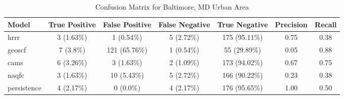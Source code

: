 \begin{table}[h!]
\centering
\begin{tabular}{lcccccc}
\hline
Model & True Positive & False Positive & False Negative & True Negative & Precision & Recall\\ \hline
hrrr & 3 (1.63\%) & 1 (0.54\%) & 5 (2.72\%) & 175 (95.11\%) & \cellcolor{red!25}0.75 & \cellcolor{red!25}0.38 \\ 
geoscf & 7 (3.8\%) & 121 (65.76\%) & 1 (0.54\%) & 55 (29.89\%) & \cellcolor{red!25}0.05 & \cellcolor{green!25}0.88 \\ 
cams & 6 (3.26\%) & 3 (1.63\%) & 2 (1.09\%) & 173 (94.02\%) & \cellcolor{red!25}0.67 & \cellcolor{green!25}0.75 \\ 
naqfc & 3 (1.63\%) & 10 (5.43\%) & 5 (2.72\%) & 166 (90.22\%) & \cellcolor{red!25}0.23 & \cellcolor{red!25}0.38 \\ 
persistence & 4 (2.17\%) & 0 (0.0\%) & 4 (2.17\%) & 176 (95.65\%) & 1.00 & 0.50 \\ 
\hline
\end{tabular}
\caption{Confusion Matrix for Baltimore, MD Urban Area}
\end{table}
